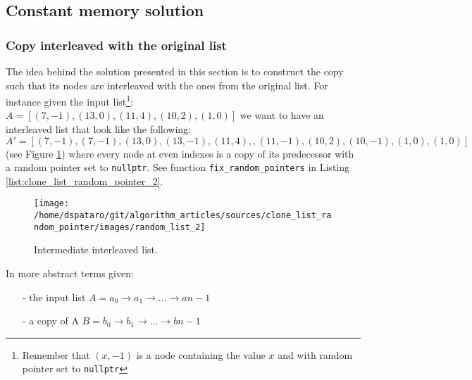 \subsection{Constant memory solution}
\label{clone_list_random_pointer:sec:interleaved_lists}
\subsubsection{Copy interleaved with the original list}
The idea behind the solution presented in this section is to construct the copy such that its nodes are interleaved with the ones from the original list. For instance given the input list\footnote{Remember that $(x,-1)$ is a node containing the value $x$ and with random pointer set to \lstinline[columns=fixed]{nullptr}}: $A = [(7,-1),(13,0),(11,4),(10,2),(1,0)]$ we want to have an interleaved list that look like the following: $A' = [(7,-1),(7,-1),(13,0),(13,-1),(11,4),,(11,-1),(10,2),(10,-1),(1,0),(1,0)]$ (see Figure \ref{fig:clone_list_random_pointer:interleaved}) where every node at even indexes is a copy of its predecessor with a random pointer set to \lstinline[columns=fixed]{nullptr}.  See function \lstinline[columns=fixed]{fix_random_pointers} in Listing \ref{list:clone_list_random_pointer_2}.


\begin{figure}
	\label{fig:clone_list_random_pointer:interleaved}
	\centering
	\texttt{[image: /home/dspataro/git/algorithm\_articles/sources/clone\_list\_random\_pointer/images/random\_list\_2]}
	\caption{Intermediate interleaved list.}
\end{figure}


In more abstract terms given:
\begin{itemize}
	\item[-] the input list  $A= a_0 \rightarrow a_1 \rightarrow \ldots \rightarrow a{n-1}$
	\item[-] a copy of A  $B = b_0 \rightarrow b_1 \rightarrow \ldots \rightarrow b{n-1}$ 
\end{itemize}

